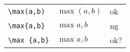 \documentclass[preview]{standalone}
\newcommand{\tA}[1]{\textcolor{cA}{#1}}
\newcommand{\tC}[1]{\textcolor{cC}{#1}}
\newcommand{\tD}[1]{\textcolor{cD}{#1}}
\begin{document}
\begin{table}[h]
    \centering
    \begin{tabular}{lll}
        \verb|\max(a,b)|  & $\max(a,b)$  & \tA{ok}  \\
        \verb|\max{a,b}|  & $\max{a,b}$  & \tD{ng}  \\
        \verb|\max {a,b}| & $\max {a,b}$ & \tC{ok?}
    \end{tabular}
\end{table}
\end{document}

